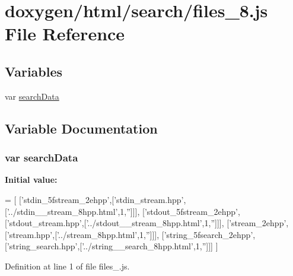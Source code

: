 \hypertarget{a00081}{}\section{doxygen/html/search/files\+\_\+8.js File Reference}
\label{a00081}
\subsection*{Variables}
\begin{DoxyCompactItemize}
\item 
var \hyperlink{a00081_ad01a7523f103d6242ef9b0451861231e}{search\+Data}
\end{DoxyCompactItemize}


\subsection{Variable Documentation}
\hypertarget{a00081_ad01a7523f103d6242ef9b0451861231e}{}
\subsubsection[{search\+Data}]{\setlength{\rightskip}{0pt plus 5cm}var search\+Data}\label{a00081_ad01a7523f103d6242ef9b0451861231e}
{\bfseries Initial value\+:}
\begin{DoxyCode}
=
[
  [\textcolor{stringliteral}{'stdin\_5fstream\_2ehpp'},[\textcolor{stringliteral}{'stdin\_stream.hpp'},[\textcolor{stringliteral}{'../stdin\_\_stream\_8hpp.html'},1,\textcolor{stringliteral}{''}]]],
  [\textcolor{stringliteral}{'stdout\_5fstream\_2ehpp'},[\textcolor{stringliteral}{'stdout\_stream.hpp'},[\textcolor{stringliteral}{'../stdout\_\_stream\_8hpp.html'},1,\textcolor{stringliteral}{''}]]],
  [\textcolor{stringliteral}{'stream\_2ehpp'},[\textcolor{stringliteral}{'stream.hpp'},[\textcolor{stringliteral}{'../stream\_8hpp.html'},1,\textcolor{stringliteral}{''}]]],
  [\textcolor{stringliteral}{'string\_5fsearch\_2ehpp'},[\textcolor{stringliteral}{'string\_search.hpp'},[\textcolor{stringliteral}{'../string\_\_search\_8hpp.html'},1,\textcolor{stringliteral}{''}]]]
]
\end{DoxyCode}


Definition at line 1 of file files\+\_.\+js.

